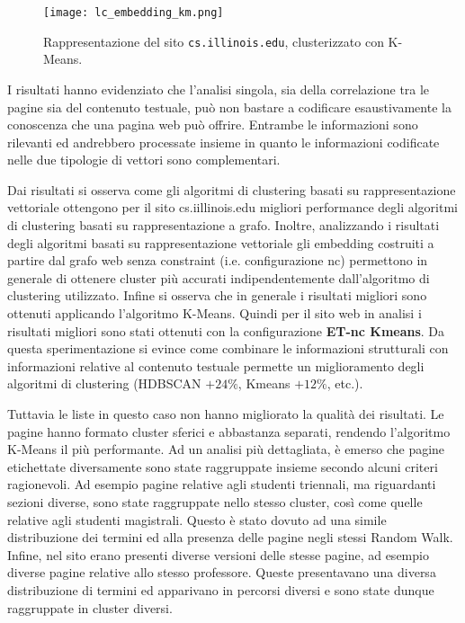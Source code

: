 \begin{figure}[ht!]
	\centering
	\texttt{[image: lc\_embedding\_km.png]}
	\caption{Rappresentazione del sito \texttt{cs.illinois.edu}, clusterizzato con K-Means.}
	\label{nc_embedding_km}
\end{figure}

I risultati hanno evidenziato che l'analisi singola, sia della correlazione tra le pagine sia del contenuto testuale, può non bastare a codificare esaustivamente la conoscenza che una pagina web può offrire. Entrambe le informazioni sono rilevanti ed andrebbero processate insieme in quanto le informazioni codificate nelle due tipologie di vettori sono complementari.

Dai risultati si osserva come gli algoritmi di clustering basati su rappresentazione vettoriale ottengono per il sito cs.iillinois.edu migliori performance degli algoritmi di clustering basati su rappresentazione a grafo.
Inoltre, analizzando i risultati degli algoritmi basati su rappresentazione vettoriale gli embedding costruiti a partire dal grafo web senza constraint (i.e. configurazione nc) permettono in generale di ottenere cluster più accurati indipendentemente dall'algoritmo di clustering utilizzato.
Infine si osserva che in generale i risultati migliori sono ottenuti applicando l'algoritmo K-Means.
Quindi per il sito web in analisi i risultati migliori sono stati ottenuti con la configurazione \textbf{ET-nc Kmeans}. 
Da questa sperimentazione si evince come combinare le informazioni strutturali con informazioni relative al contenuto testuale permette un miglioramento degli algoritmi di clustering (HDBSCAN $+24\%$, Kmeans $+12\%$, etc.). 

Tuttavia le liste in questo caso non hanno migliorato la qualità dei risultati. Le pagine hanno formato cluster sferici e abbastanza separati, rendendo l'algoritmo K-Means il più performante. Ad un analisi più dettagliata, è emerso che pagine etichettate diversamente sono state raggruppate insieme secondo alcuni criteri ragionevoli. Ad esempio pagine relative agli studenti triennali, ma riguardanti sezioni diverse, sono state raggruppate nello stesso cluster, così come quelle relative agli studenti magistrali. Questo è stato dovuto ad una simile distribuzione dei termini ed alla presenza delle pagine negli stessi Random Walk. Infine, nel sito erano presenti diverse versioni delle stesse pagine, ad esempio diverse pagine relative allo stesso professore. Queste presentavano una diversa distribuzione di termini ed apparivano in percorsi diversi e sono state dunque raggruppate in cluster diversi.

